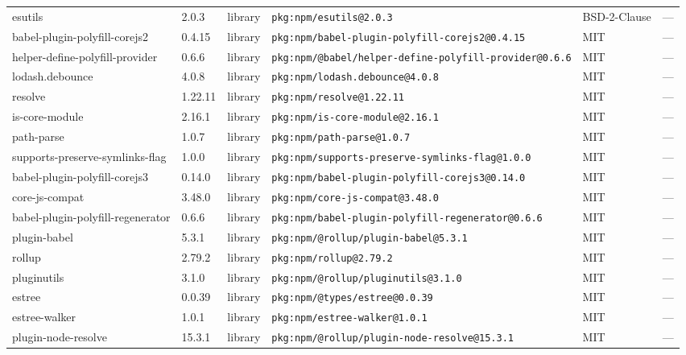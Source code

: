\documentclass[11pt,a4paper]{article}
\begin{document}
\begin{longtable}{|p{4cm}|p{2cm}|p{1.6cm}|p{5cm}|p{1.5cm}|p{3.5cm}|}
\raggedright esutils & 2.0.3 & library & \small\texttt{pkg:npm/esutils@2.0.3} & BSD-2-Clause & \small — \\
\raggedright babel-plugin-polyfill-corejs2 & 0.4.15 & library & \small\texttt{pkg:npm/babel-plugin-polyfill-corejs2@0.4.15} & MIT & \small — \\
\raggedright helper-define-polyfill-provider & 0.6.6 & library & \small\texttt{pkg:npm/@babel/helper-define-polyfill-provider@0.6.6} & MIT & \small — \\
\raggedright lodash.debounce & 4.0.8 & library & \small\texttt{pkg:npm/lodash.debounce@4.0.8} & MIT & \small — \\
\raggedright resolve & 1.22.11 & library & \small\texttt{pkg:npm/resolve@1.22.11} & MIT & \small — \\
\raggedright is-core-module & 2.16.1 & library & \small\texttt{pkg:npm/is-core-module@2.16.1} & MIT & \small — \\
\raggedright path-parse & 1.0.7 & library & \small\texttt{pkg:npm/path-parse@1.0.7} & MIT & \small — \\
\raggedright supports-preserve-symlinks-flag & 1.0.0 & library & \small\texttt{pkg:npm/supports-preserve-symlinks-flag@1.0.0} & MIT & \small — \\
\raggedright babel-plugin-polyfill-corejs3 & 0.14.0 & library & \small\texttt{pkg:npm/babel-plugin-polyfill-corejs3@0.14.0} & MIT & \small — \\
\raggedright core-js-compat & 3.48.0 & library & \small\texttt{pkg:npm/core-js-compat@3.48.0} & MIT & \small — \\
\raggedright babel-plugin-polyfill-regenerator & 0.6.6 & library & \small\texttt{pkg:npm/babel-plugin-polyfill-regenerator@0.6.6} & MIT & \small — \\
\raggedright plugin-babel & 5.3.1 & library & \small\texttt{pkg:npm/@rollup/plugin-babel@5.3.1} & MIT & \small — \\
\raggedright rollup & 2.79.2 & library & \small\texttt{pkg:npm/rollup@2.79.2} & MIT & \small — \\
\raggedright pluginutils & 3.1.0 & library & \small\texttt{pkg:npm/@rollup/pluginutils@3.1.0} & MIT & \small — \\
\raggedright estree & 0.0.39 & library & \small\texttt{pkg:npm/@types/estree@0.0.39} & MIT & \small — \\
\raggedright estree-walker & 1.0.1 & library & \small\texttt{pkg:npm/estree-walker@1.0.1} & MIT & \small — \\
\raggedright plugin-node-resolve & 15.3.1 & library & \small\texttt{pkg:npm/@rollup/plugin-node-resolve@15.3.1} & MIT & \small — \\

\end{longtable}
\end{document}
